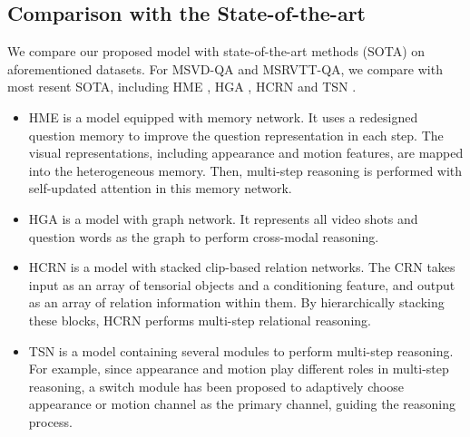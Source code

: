 \documentclass[journal]{IEEEtran}
\begin{document}
\subsection{Comparison with the State-of-the-art}
We compare our proposed model with state-of-the-art methods (SOTA) on aforementioned datasets. For MSVD-QA and MSRVTT-QA, we compare with most resent SOTA, including HME \cite{fan2019heterogeneous}, HGA \cite{jiang2020reasoning}, HCRN \cite{le2020hierarchical} and TSN \cite{yang2019question}.
\begin{itemize}
    \item HME is a model equipped with memory network. It uses a redesigned question memory to improve the question representation in each step. The visual representations, including appearance and motion features, are mapped into the heterogeneous memory. Then, multi-step reasoning is performed with self-updated attention in this memory network.
    \item HGA is a model with graph network. It represents all video shots and question words as the graph to perform cross-modal reasoning.
    \item HCRN is a model with stacked clip-based relation networks. The CRN takes input as an array of tensorial objects and a conditioning feature, and output as an array of relation information within them. By hierarchically stacking these blocks, HCRN performs multi-step relational reasoning.
    \item TSN is a model containing several modules to perform multi-step reasoning. For example, since appearance and motion play different roles in multi-step reasoning, a switch module has been proposed to adaptively choose appearance or motion channel as the primary channel, guiding the reasoning process. 
\end{itemize}
\end{document}
